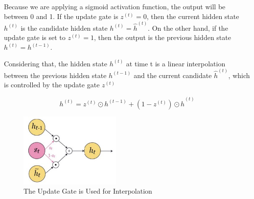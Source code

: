 \newpage
\noindent Because we are applying a sigmoid activation function, the output will be between 0 and 1. If the update gate is $z^{(t)} = 0$, then the current hidden state $h^{(t)}$ is the candidate hidden state $h^{(t)} = \hat{h}^{(t)}$. On the other hand, if the update gate is set to $z^{(t)} = 1$, then the output is the previous hidden state $ h^{(t)} = h^{(t-1)}$.

\begin{figure}[h]
\centering     %
{}
\label{fig:update-gate-zt}
\end{figure}


\noindent Considering that, the hidden state $h^{(t)}$ at time t is a linear interpolation between the previous hidden state $h^{(t-1)}$ and the current candidate $\hat{h}^{(t)}$, which is controlled by the update gate $z^{(t)}$

$$ h^{(t)} = z^{(t)} \odot h^{(t-1)} + (1 - z^{(t)}) \odot \hat{h}^{(t)} $$

\begin{figure}[h]
    \centering
    \includegraphics[width=5cm]{Images/gru-update-gate1.jpg}
    \caption{The Update Gate is Used for Interpolation}
    \label{fig:update-gate}
\end{figure}

